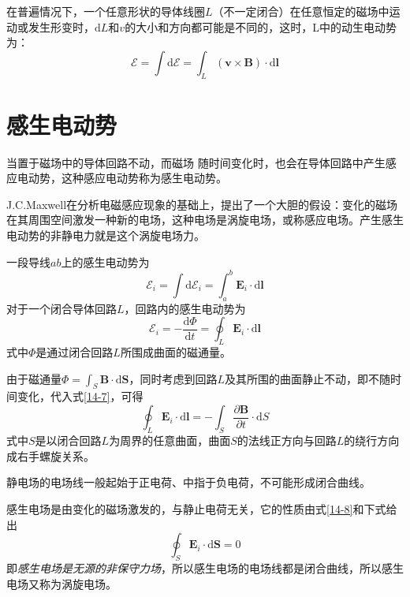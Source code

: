 \documentclass[
	12pt, %
	a4paper, %
]{myLegrandOrangeBook}
\newcommand{\rmd}{\mathrm{d}}
\newcommand{\deriv}[2]{\frac{\rmd #1}{\rmd #2}}
\newcommand{\pderiv}[2]{\frac{\partial #1}{\partial #2}}
\begin{document}
在普遍情况下，一个任意形状的导体线圈\(L\)（不一定闭合）在任意恒定的磁场中运动或发生形变时，\(\rmd L\)和\(v\)的大小和方向都可能是不同的，这时，L中的动生电动势为：
\begin{equation}
    \mathscr{E} = \int \rmd \mathscr{E} = \int_L \left(\boldsymbol{v} \times \boldsymbol{B}\right) \cdot \rmd \boldsymbol{l}
\end{equation}

\section{感生电动势}

\begin{definition}[感生电动势]
当置于磁场中的导体回路不动，而磁场 随时间变化时，也会在导体回路中产生感应电动势，这种感应电动势称为感生电动势。
\end{definition}

J.C.Maxwell在分析电磁感应现象的基础上，提出了一个大胆的假设：变化的磁场在其周围空间激发一种新的电场，这种电场是涡旋电场，或称感应电场。产生感生电动势的非静电力就是这个涡旋电场力。

一段导线\(ab\)上的感生电动势为
\begin{equation}
    \mathscr{E}_i = \int \rmd \mathscr{E}_i = \int_{a}^{b} \boldsymbol{E}_i \cdot \rmd \boldsymbol{l}
\end{equation}
对于一个闭合导体回路\(L\)，回路内的感生电动势为
\begin{equation}
    \mathscr{E}_i = -\deriv{\varPhi}{t} = \oint_L \boldsymbol{E}_i \cdot \rmd \boldsymbol{l}
    \label{14-7}
\end{equation}
式中\(\varPhi\)是通过闭合回路\(L\)所围成曲面的磁通量。

由于磁通量\(\varPhi = \int_S \boldsymbol{B} \cdot \rmd \boldsymbol{S}\)，同时考虑到回路\(L\)及其所围的曲面静止不动，即不随时间变化，代入式\ref{14-7}，可得
\begin{equation}
    \oint_L \boldsymbol{E}_i \cdot \rmd \boldsymbol{l} = -\int_{S} \pderiv{\boldsymbol{B}}{t} \cdot \rmd S
    \label{14-8}
\end{equation}
式中\(S\)是以闭合回路\(L\)为周界的任意曲面，曲面\(S\)的法线正方向与回路\(L\)的绕行方向成右手螺旋关系。

静电场的电场线一般起始于正电荷、中指于负电荷，不可能形成闭合曲线。

感生电场是由变化的磁场激发的，与静止电荷无关，它的性质由式\ref{14-8}和下式给出
\begin{equation}
    \oint_S \boldsymbol{E}_i \cdot \rmd \boldsymbol{S} = 0
\end{equation}
即\emph{感生电场是无源的非保守力场}，所以感生电场的电场线都是闭合曲线，所以感生电场又称为涡旋电场。
\end{document}

